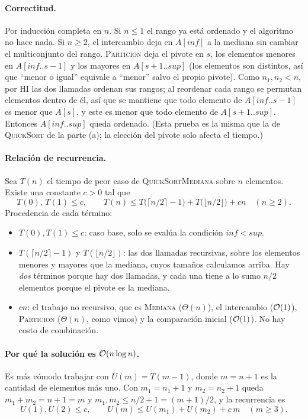 \paragraph{Correctitud.} Por inducción completa en $n$. Si $n\le1$ el rango ya está
ordenado y el algoritmo no hace nada. Si $n\ge2$, el intercambio deja en
$A[\mathit{inf}]$ a la mediana sin cambiar el multiconjunto del rango. \textsc{Particion}
deja el pivote en $s$, los elementos menores en $A[\mathit{inf}..s-1]$ y los mayores en
$A[s+1..\mathit{sup}]$ (los elementos son distintos, así que ``menor o igual'' equivale a
``menor'' salvo el propio pivote). Como $n_1,n_2<n$, por HI las dos llamadas ordenan sus
rangos; al reordenar cada rango se permutan elementos dentro de él, así que se mantiene que
todo elemento de $A[\mathit{inf}..s-1]$ es menor que $A[s]$, y este es menor que todo
elemento de $A[s+1..\mathit{sup}]$. Entonces $A[\mathit{inf}..\mathit{sup}]$ queda
ordenado. (Esta prueba es la misma que la de \textsc{QuickSort} de la parte (a); la
elección del pivote solo afecta el tiempo.)

\paragraph{Relación de recurrencia.} Sea $T(n)$ el tiempo de peor caso de
\textsc{QuickSortMediana} sobre $n$ elementos. Existe una constante $c>0$ tal que
\[
T(0),\,T(1)\le c,\qquad
T(n)\le T\bigl(\lceil n/2\rceil-1\bigr)+T\bigl(\lfloor n/2\rfloor\bigr)+cn\quad(n\ge2).
\]
Procedencia de cada término:
\begin{itemize}
\item $T(0),T(1)\le c$: caso base, solo se evalúa la condición $\mathit{inf}<\mathit{sup}$.
\item $T(\lceil n/2\rceil-1)$ y $T(\lfloor n/2\rfloor)$: las dos llamadas recursivas, sobre
los elementos menores y mayores que la mediana, cuyos tamaños calculamos arriba. Hay
\emph{dos} términos porque hay dos llamadas, y cada una tiene a lo sumo $n/2$ elementos
porque el pivote es la mediana.
\item $cn$: el trabajo no recursivo, que es \textsc{Mediana} ($\Theta(n)$), el intercambio
($\mathcal{O}(1)$), \textsc{Particion} ($\Theta(n)$, como vimos) y la comparación inicial
($\mathcal{O}(1)$). No hay costo de combinación.
\end{itemize}

\paragraph{Por qué la solución es $\mathcal{O}(n\log n)$.} Es más cómodo trabajar con
$U(m)=T(m-1)$, donde $m=n+1$ es la cantidad de elementos más uno. Con $m_1=n_1+1$ y
$m_2=n_2+1$ queda $m_1+m_2=n+1=m$ y $m_1,m_2\le n/2+1=(m+1)/2$, y la recurrencia es
\[
U(1),U(2)\le c,\qquad U(m)\le U(m_1)+U(m_2)+c\,m\quad(m\ge3).
\]

